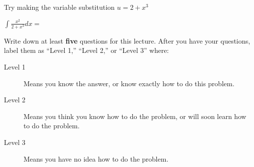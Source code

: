 \documentclass{ximera}
\begin{document}
\begin{question}
	\begin{hint}
		Try making the variable substitution $u = 2+x^3$
	\end{hint}
	
	$\displaystyle \int \frac{x^2}{2+x^3} dx=$
\end{question}

Write down at least \textbf{five} questions for this lecture. After
you have your questions, label them as ``Level 1,'' ``Level 2,'' or ``Level 3'' where:
\begin{description}
\item[Level 1] Means you know the answer, or know exactly how to do this problem.
\item[Level 2] Means you think you know how to do the problem, or will soon learn how to do the problem.
\item[Level 3] Means you have no idea how to do the problem. 
\end{description}
\begin{question}
  \begin{freeResponse}
  \end{freeResponse}
\end{question}
\end{document}

